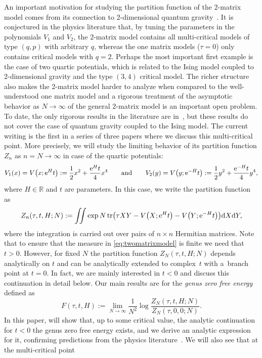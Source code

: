 \documentclass[pdftex]{sigma}
\DeclareMathOperator{\tr}{tr}
\numberwithin{equation}{section}
\begin{document}
An important motivation for studying the partition function of the 2-matrix model comes from its connection to 2-dimensional quantum gravity~\cite{KB,DS,GM1,GM2}. It is conjectured in the physics literature that, by tuning the parameters in the polynomials $V_1$ and $V_2$, the 2-matrix model contains all multi-critical models of type $(q,p)$ with arbitrary $q$, whereas the one matrix models ($\tau=0$) only contains critical models with $q=2$. Perhaps the most important first example is the case of two quartic potentials, which is related to the Ising model coupled to 2-dimensional gravity and the type $(3,4)$ critical model. The richer structure also makes the 2-matrix model harder to analyze when compared to the well-understood one matrix model and a rigorous treatment of the asymptotic behavior as $N\to \infty$ of the general 2-matrix model is an important open problem. To date, the only rigorous results in the literature are in~\cite{DG,DK1,DKM}, but these results do not cover the case of quantum gravity coupled to the Ising model. The current writing is the first in a series of three papers where we discuss this multi-critical point. More precisely, we will study the limiting behavior of its partition function $Z_n$ as $n=N \to \infty$ in case of the quartic potentials:
\[
V_1(x) = V\bigl(x;{\rm e}^H t\bigr):=\frac12 x^2 + \frac{{\rm e}^H t}{4} x^4 \qquad \text{and} \qquad V_2(y)=V\bigl(y;{\rm e}^{-H} t\bigr):=\frac12 y^2 + \frac{{\rm e}^{-H} t}{4} y^4,
\]
where $H \in \mathbb R $ and $t$ are parameters. In this case, we write the partition function as
 \begin{equation*}
 Z_n(\tau,t,H;N) := \iint \exp N \tr \bigl(\tau X Y- V\bigl(X;{\rm e}^H t\bigr) -V\bigl(Y;{\rm e}^{-H} t\bigr)\bigr) {\rm d}X {\rm d}Y,
 \end{equation*}
where the integration is carried out over pairs of $n\times n$ Hermitian matrices.
Note that to ensure that the measure in \eqref{eq:twomatrixmodel} is finite we need that $t>0$. However, for fixed $N$ the partition function $Z_N(\tau,t,H;N)$ depends analytically on $t$ and can be analytically extended to complex~$t$ with a~branch point at $t=0$. In fact, we are mainly interested in $t<0$ and discuss this continuation in detail below.
Our main results are for the \textit{genus zero free energy} defined as
 \begin{equation}\label{free-energy-2-matrix-model}
 F(\tau,t,H) := \lim_{N\to \infty} \frac{1}{N^2} \log \frac{Z_{N}(\tau,t,H;N)}{Z_{N}(\tau,0,0;N)}.
 \end{equation}
In this paper, will show that, up to some critical value, the analytic continuation for $t<0$ the genus zero free energy exists, and we derive an analytic expression for it, confirming predictions from the physics literature~\cite{Kazakov2, Kazakov1}. We will also see that at the multi-critical point
\end{document}
